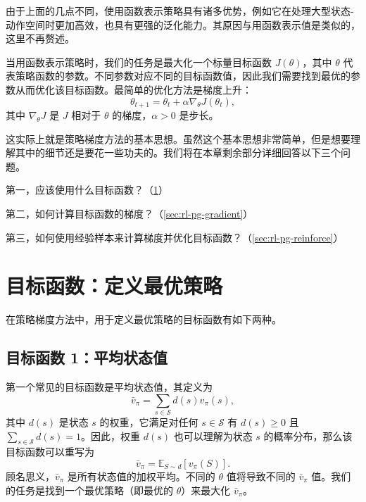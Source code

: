由于上面的几点不同，使用函数表示策略具有诸多优势，例如它在处理大型状态-动作空间时更加高效，也具有更强的泛化能力。其原因与用函数表示值是类似的，这里不再赘述。

当用函数表示策略时，我们的任务是最大化一个标量目标函数 $J(\theta)$，其中 $\theta$ 代表策略函数的参数。不同参数对应不同的目标函数值，因此我们需要找到最优的参数从而优化该目标函数。最简单的优化方法是梯度上升：
\begin{equation}
\theta_{t+1} = \theta_t + \alpha \nabla_{\theta} J(\theta_t),
\end{equation}
其中 $\nabla_{\theta}J$ 是 $J$ 相对于 $\theta$ 的梯度，$\alpha > 0$ 是步长。

这实际上就是策略梯度方法的基本思想。虽然这个基本思想非常简单，但是想要理解其中的细节还是要花一些功夫的。我们将在本章剩余部分详细回答以下三个问题。

第一，应该使用什么目标函数？（\cref{sec:rl-pg-objective}）

第二，如何计算目标函数的梯度？（\cref{sec:rl-pg-gradient}）

第三，如何使用经验样本来计算梯度并优化目标函数？（\cref{sec:rl-pg-reinforce}）

\section{目标函数：定义最优策略}
\label{sec:rl-pg-objective}

在策略梯度方法中，用于定义最优策略的目标函数有如下两种。

\subsection*{目标函数 1：平均状态值}

第一个常见的目标函数是平均状态值，其定义为
\begin{equation}
\bar{v}_{\pi} = \sum_{s \in \mathcal{S}} d(s) v_{\pi}(s),
\end{equation}
其中 $d(s)$ 是状态 $s$ 的权重，它满足对任何 $s \in \mathcal{S}$ 有 $d(s) \geqslant 0$ 且 $\sum_{s \in \mathcal{S}} d(s) = 1$。因此，权重 $d(s)$ 也可以理解为状态 $s$ 的概率分布，那么该目标函数可以重写为
\begin{equation}
\bar{v}_{\pi} = \mathbb{E}_{S \sim d}[v_{\pi}(S)].
\end{equation}
顾名思义，$\bar{v}_{\pi}$ 是所有状态值的加权平均。不同的 $\theta$ 值将导致不同的 $\bar{v}_{\pi}$ 值。我们的任务是找到一个最优策略（即最优的 $\theta$）来最大化 $\bar{v}_{\pi}$。

